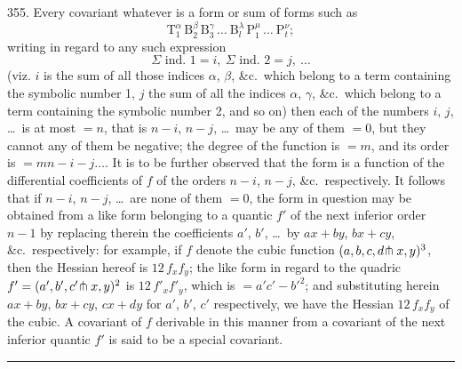 \documentclass[11pt,a4paper]{article}
\begin{document}
355. Every covariant whatever is a form or sum of forms such as
\[
\mathrm{T}_{1}^{\alpha}\, \mathrm{B}_{2}^{\beta}\, \mathrm{B}_{3}^{\gamma}\, \ldots\ \mathrm{B}_{l}^{\lambda}\, \mathrm{P}_{1}^{\mu}\, \ldots\ \mathrm{P}_{t}^{\nu};
\]
writing in regard to any such expression
\[
\Sigma \text{ ind.\ } 1 = i,\ \Sigma \text{ ind.\ } 2 = j,\ \ldots
\]
(viz. $i$ is the sum of all those indices $\alpha$, $\beta$, \&c.\ which belong to a term containing the symbolic number 1, $j$ the sum of all the indices $\alpha$, $\gamma$, \&c.\ which belong to a term containing the symbolic number 2, and so on) then each of the numbers $i$, $j$, \ldots\ is at most $= n$, that is $n-i$, $n-j$, \ldots\ may be any of them $= 0$, but they cannot any of them be negative; the degree of the function is $= m$, and its order is $= mn - i - j \ldots$. It is to be further observed that the form is a function of the differential coefficients of $f$ of the orders $n-i$, $n-j$, \&c.\ respectively. It follows that if $n-i$, $n-j$, \ldots\ are none of them $=0$, the form in question may be obtained from a like form belonging to a quantic $f'$ of the next inferior order $n-1$ by replacing therein the coefficients $a'$, $b'$, \ldots\ by $ax+by$, $bx+cy$, \&c.\ respectively: for example, if $f$ denote the cubic function $(a, b, c, d\hspace{-0.2em}\pitchfork x, y)^{3}$, then the Hessian hereof is $12\, f_{x}f_{y}$; the like form in regard to the quadric $f' = (a', b', c'\hspace{-0.2em}\pitchfork x, y)^{2}$ is $12\, f'_{x}f'_{y}$, which is $= a'c' - b'^{2}$; and substituting herein $ax+by$, $bx+cy$, $cx+dy$ for $a'$, $b'$, $c'$ respectively, we have the Hessian $12\, f_{x}f_{y}$ of the cubic. A covariant of $f$ derivable in this manner from a covariant of the next inferior quantic $f'$ is said to be a special covariant.

\vspace{2em}
\begin{center}
\rule{0.5\textwidth}{0.4pt}
\end{center}
\end{document}

